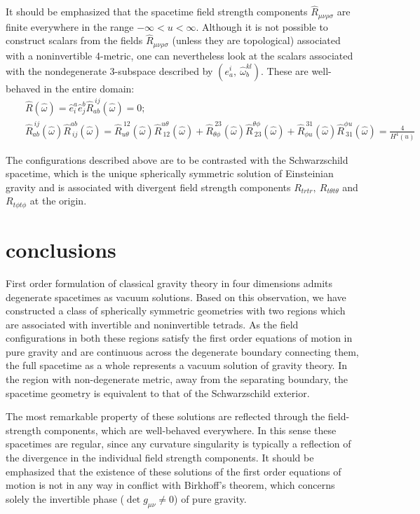 \documentclass[preprint,aps,superscriptaddress,nofootinbib]{revtex4-1}
\begin{document}
It should be emphasized that the spacetime field strength components 
$\hat{R}_{\mu\nu\rho\sigma}$ are finite everywhere in the range
$-\infty<u<\infty$. Although it is not possible to construct  
scalars  from the fields $\hat{R}_{\mu\nu\rho\sigma}$ 
(unless they are topological) associated with a noninvertible 
4-metric, one can nevertheless look at the scalars associated 
with the nondegenerate 3-subspace described by 
$(e_a^i,~\hat{\omega}_b^{kl})$. These  are  well-behaved 
in the entire domain:
\begin{eqnarray*}
&& \hat{R}(\hat{\omega})=\hat{e}^a_i \hat{e}^b_j \hat{R}_{ab}^{~ij}
(\hat{\omega})=0;\\
&& \hat{R}_{ab}^{~ij}(\hat{\omega})\hat{R}^{ab}_{~ij}
(\hat{\omega})=\hat{R}_{u\theta}^{~12}(\hat{\omega})
\hat{R}^{u\theta}_{~12}(\hat{\omega})+\hat{R}_{\theta\phi}^{~23}
(\hat{\omega})\hat{R}^{\theta\phi}_{~23}(\hat{\omega})
+\hat{R}_{\phi u}^{~31}(\hat{\omega})\hat{R}^{\phi u}_{~31}
(\hat{\omega})= \frac{4}{H^4(u)}
\end{eqnarray*}
 
The configurations described above are to be contrasted with 
the Schwarzschild spacetime, which is the unique spherically 
symmetric solution of Einsteinian gravity and is associated 
with divergent field strength components $R_{trtr},~
R_{t\theta t\theta}$ and $R_{t\phi t\phi}$ at the origin. 

 
\section{conclusions}
First order formulation of classical gravity theory in four dimensions 
admits degenerate spacetimes as vacuum solutions. Based on this 
observation, we have  constructed a class of spherically symmetric 
geometries with two regions which are associated with invertible and 
noninvertible tetrads. As the field configurations in 
both these regions satisfy the first order equations of motion in pure
gravity and are continuous across the degenerate boundary connecting 
them, the full spacetime as a whole represents a vacuum solution of 
gravity theory. In the region with non-degenerate metric, away from 
the separating  boundary, the spacetime  geometry is equivalent to  
that of the Schwarzschild exterior.

The most remarkable property of these solutions are reflected through 
the field-strength components, which are well-behaved everywhere. In 
this sense these spacetimes are regular, since any curvature singularity 
is typically a reflection of the divergence in the individual field 
strength components. It should be emphasized that the existence 
of these solutions of the first order equations of motion is 
not in any way in conflict with Birkhoff's theorem, which concerns 
solely the invertible phase ($\det g_{\mu\nu}\neq 0$) of pure gravity.
\end{document}
